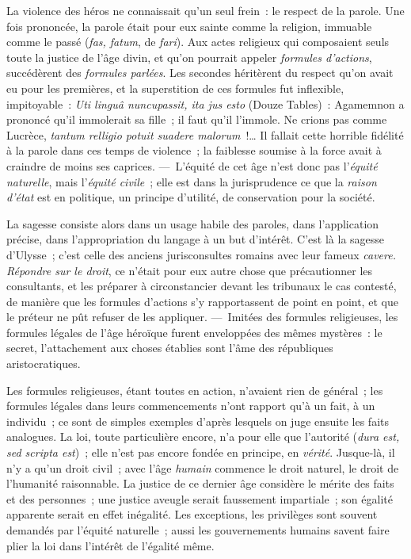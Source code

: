 \documentclass[french,twoside]{book} %
\begin{document}
La violence des héros ne connaissait qu’un seul frein : le respect de la parole. Une fois prononcée, la parole était pour eux sainte comme la religion, immuable comme le passé ({\itshape fas, fatum}, de {\itshape fari}). Aux actes religieux qui composaient seuls toute la justice de l’âge divin, et qu’on pourrait appeler  {\itshape formules d’actions}, succédèrent des {\itshape formules parlées}. Les secondes héritèrent du respect qu’on avait eu pour les premières, et la superstition de ces formules fut inflexible, impitoyable : \emph{{\itshape Uti linguâ nuncupassit, ita jus esto}} (Douze Tables) : Agamemnon a prononcé qu’il immolerait sa fille ; il faut qu’il l’immole. Ne crions pas comme Lucrèce, \emph{{\itshape tantum relligio potuit suadere malorum}} !… Il fallait cette horrible fidélité à la parole dans ces temps de violence ; la faiblesse soumise à la force avait à craindre de moins ses caprices. — L’équité de cet âge n’est donc pas l’{\itshape équité naturelle}, mais l’{\itshape équité civile} ; elle est dans la jurisprudence ce que la {\itshape raison d’état} est en politique, un principe d’utilité, de conservation pour la société.\par
La sagesse consiste alors dans un usage habile des paroles, dans l’application précise, dans l’appropriation du langage à un but d’intérêt. C’est là la sagesse d’Ulysse ; c’est celle des anciens jurisconsultes romains avec leur fameux {\itshape cavere. Répondre sur le droit}, ce n’était pour eux autre chose que précautionner les consultants, et les préparer à circonstancier devant les tribunaux le cas contesté, de manière que les formules d’actions s’y rapportassent de point en point, et que le préteur ne pût refuser de les appliquer. — Imitées des formules religieuses, les formules légales de l’âge héroïque  furent enveloppées des mêmes mystères : le secret, l’attachement aux choses établies sont l’âme des républiques aristocratiques.\par
Les formules religieuses, étant toutes en action, n’avaient rien de général ; les formules légales dans leurs commencements n’ont rapport qu’à un fait, à un individu ; ce sont de simples exemples d’après lesquels on juge ensuite les faits analogues. La loi, toute particulière encore, n’a pour elle que l’autorité ({\itshape dura est, sed scripta est}) ; elle n’est pas encore fondée en principe, en {\itshape vérité}. Jusque-là, il n’y a qu’un droit civil ; avec l’âge {\itshape humain} commence le droit naturel, le droit de l’humanité raisonnable. La justice de ce dernier âge considère le mérite des faits et des personnes ; une justice aveugle serait faussement impartiale ; son égalité apparente serait en effet inégalité. Les exceptions, les privilèges sont souvent demandés par l’équité naturelle ; aussi les gouvernements humains savent faire plier la loi dans l’intérêt de l’égalité même.\par
\end{document}
